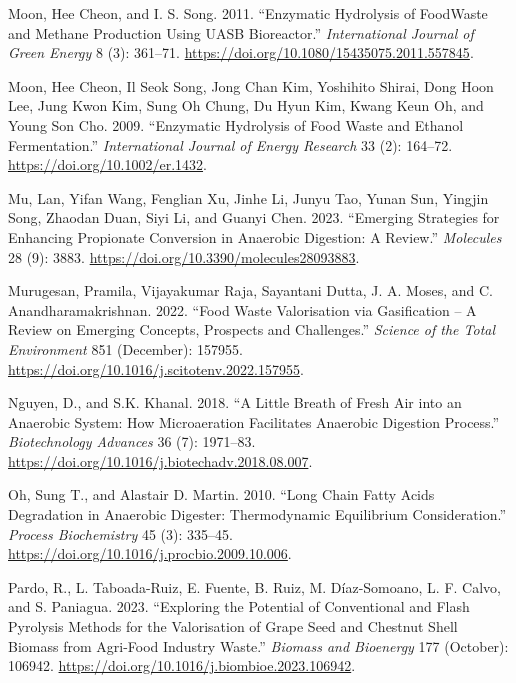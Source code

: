 \documentclass[11pt]{report}
\begin{document}
\begin{hangparas}{1.5em}{1}
\hypertarget{citeproc_bib_item_49}{Moon, Hee Cheon, and I. S. Song. 2011. “Enzymatic Hydrolysis of FoodWaste and Methane Production Using UASB Bioreactor.” \textit{International Journal of Green Energy} 8 (3): 361–71. \url{https://doi.org/10.1080/15435075.2011.557845}.}

\hypertarget{citeproc_bib_item_50}{Moon, Hee Cheon, Il Seok Song, Jong Chan Kim, Yoshihito Shirai, Dong Hoon Lee, Jung Kwon Kim, Sung Oh Chung, Du Hyun Kim, Kwang Keun Oh, and Young Son Cho. 2009. “Enzymatic Hydrolysis of Food Waste and Ethanol Fermentation.” \textit{International Journal of Energy Research} 33 (2): 164–72. \url{https://doi.org/10.1002/er.1432}.}

\hypertarget{citeproc_bib_item_51}{Mu, Lan, Yifan Wang, Fenglian Xu, Jinhe Li, Junyu Tao, Yunan Sun, Yingjin Song, Zhaodan Duan, Siyi Li, and Guanyi Chen. 2023. “Emerging Strategies for Enhancing Propionate Conversion in Anaerobic Digestion: A Review.” \textit{Molecules} 28 (9): 3883. \url{https://doi.org/10.3390/molecules28093883}.}

\hypertarget{citeproc_bib_item_52}{Murugesan, Pramila, Vijayakumar Raja, Sayantani Dutta, J. A. Moses, and C. Anandharamakrishnan. 2022. “Food Waste Valorisation via Gasification – A Review on Emerging Concepts, Prospects and Challenges.” \textit{Science of the Total Environment} 851 (December): 157955. \url{https://doi.org/10.1016/j.scitotenv.2022.157955}.}

\hypertarget{citeproc_bib_item_53}{Nguyen, D., and S.K. Khanal. 2018. “A Little Breath of Fresh Air into an Anaerobic System: How Microaeration Facilitates Anaerobic Digestion Process.” \textit{Biotechnology Advances} 36 (7): 1971–83. \url{https://doi.org/10.1016/j.biotechadv.2018.08.007}.}

\hypertarget{citeproc_bib_item_54}{Oh, Sung T., and Alastair D. Martin. 2010. “Long Chain Fatty Acids Degradation in Anaerobic Digester: Thermodynamic Equilibrium Consideration.” \textit{Process Biochemistry} 45 (3): 335–45. \url{https://doi.org/10.1016/j.procbio.2009.10.006}.}

\hypertarget{citeproc_bib_item_55}{Pardo, R., L. Taboada-Ruiz, E. Fuente, B. Ruiz, M. Díaz-Somoano, L. F. Calvo, and S. Paniagua. 2023. “Exploring the Potential of Conventional and Flash Pyrolysis Methods for the Valorisation of Grape Seed and Chestnut Shell Biomass from Agri-Food Industry Waste.” \textit{Biomass and Bioenergy} 177 (October): 106942. \url{https://doi.org/10.1016/j.biombioe.2023.106942}.}


\end{hangparas}
\end{document}
